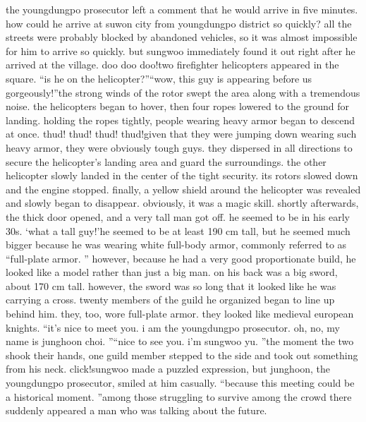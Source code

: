 the youngdungpo prosecutor left a comment that he would arrive in five minutes.
how could he arrive at suwon city from youngdungpo district so quickly? all the streets were probably blocked by abandoned vehicles, so it was almost impossible for him to arrive so quickly.
but sungwoo immediately found it out right after he arrived at the village.
doo doo doo!two firefighter helicopters appeared in the square.
“is he on the helicopter?”“wow, this guy is appearing before us gorgeously!”the strong winds of the rotor swept the area along with a tremendous noise.
 the helicopters began to hover, then four ropes lowered to the ground for landing.
holding the ropes tightly, people wearing heavy armor began to descend at once.
thud! thud! thud! thud!given that they were jumping down wearing such heavy armor, they were obviously tough guys.
they dispersed in all directions to secure the helicopter’s landing area and guard the surroundings.
the other helicopter slowly landed in the center of the tight security.
its rotors slowed down and the engine stopped.
 finally, a yellow shield around the helicopter was revealed and slowly began to disappear.
 obviously, it was a magic skill.
shortly afterwards, the thick door opened, and a very tall man got off.
 he seemed to be in his early 30s.
‘what a tall guy!’he seemed to be at least 190 cm tall, but he seemed much bigger because he was wearing white full-body armor, commonly referred to as “full-plate armor.
” however, because he had a very good proportionate build, he looked like a model rather than just a big man.
on his back was a big sword, about 170 cm tall.
 however, the sword was so long that it looked like he was carrying a cross.
twenty members of the guild he organized began to line up behind him.
 they, too, wore full-plate armor.
 they looked like medieval european knights.
“it’s nice to meet you.
 i am the youngdungpo prosecutor.
 oh, no, my name is junghoon choi.
”“nice to see you.
 i’m sungwoo yu.
”the moment the two shook their hands, one guild member stepped to the side and took out something from his neck.
click!sungwoo made a puzzled expression, but junghoon, the youngdungpo prosecutor, smiled at him casually.
“because this meeting could be a historical moment.
”among those struggling to survive among the crowd there suddenly appeared a man who was talking about the future.


 